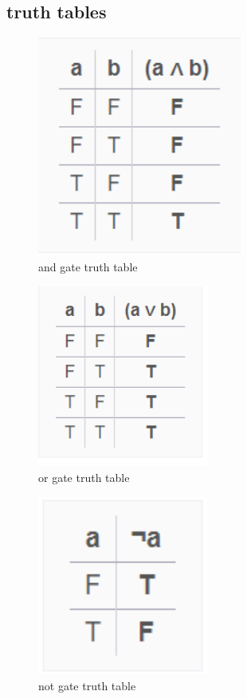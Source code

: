 \documentclass[pdftex,12pt,a4paper]{article}
\begin{document}
\subsection{truth tables}

    \begin{figure}[H]
    	\centering
    	\includegraphics[width=0.6\textwidth]{truth tables/and.png}	
    	\caption{and gate truth table}
    	\label{and gate truth table}
    \end{figure}
    
    \begin{figure}[H]
    	\centering
    	\includegraphics[width=0.5\textwidth]{truth tables/or.png}	
    	\caption{or gate truth table}
    	\label{or gate truth table}
    \end{figure}
    
    \begin{figure}[H]
    	\centering
    	\includegraphics[width=0.5\textwidth]{truth tables/not.png}	
    	\caption{not gate truth table}
    	\label{not gate truth table}
    \end{figure}
    
\end{document}
